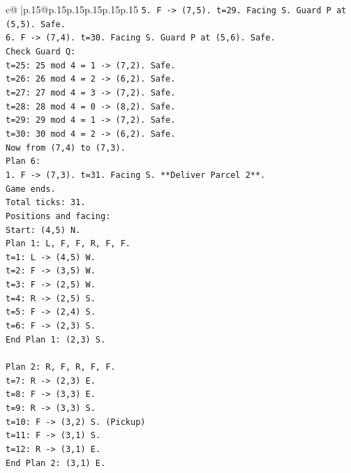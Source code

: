 \documentclass{article}
\begin{document}
{\begin{supertabular}{c@{$\;$}|p{.15\linewidth}@{}p{.15\linewidth}p{.15\linewidth}p{.15\linewidth}p{.15\linewidth}p{.15\linewidth}}
{{{\texttt{5. F {-}> (7,5). t=29. Facing S. Guard P at (5,5). Safe.} \\
\texttt{6. F {-}> (7,4). t=30. Facing S. Guard P at (5,6). Safe.} \\
\texttt{Check Guard Q:} \\
\texttt{t=25: 25 mod 4 = 1 {-}> (7,2). Safe.} \\
\texttt{t=26: 26 mod 4 = 2 {-}> (6,2). Safe.} \\
\texttt{t=27: 27 mod 4 = 3 {-}> (7,2). Safe.} \\
\texttt{t=28: 28 mod 4 = 0 {-}> (8,2). Safe.} \\
\texttt{t=29: 29 mod 4 = 1 {-}> (7,2). Safe.} \\
\texttt{t=30: 30 mod 4 = 2 {-}> (6,2). Safe.} \\
\texttt{Now from (7,4) to (7,3).} \\
\texttt{Plan 6:} \\
\texttt{1. F {-}> (7,3). t=31. Facing S. **Deliver Parcel 2**.} \\
\texttt{Game ends.} \\
\texttt{Total ticks: 31.} \\
\texttt{Positions and facing:} \\
\texttt{Start: (4,5) N.} \\
\texttt{Plan 1: L, F, F, R, F, F.} \\
\texttt{t=1: L {-}> (4,5) W.} \\
\texttt{t=2: F {-}> (3,5) W.} \\
\texttt{t=3: F {-}> (2,5) W.} \\
\texttt{t=4: R {-}> (2,5) S.} \\
\texttt{t=5: F {-}> (2,4) S.} \\
\texttt{t=6: F {-}> (2,3) S.} \\
\texttt{End Plan 1: (2,3) S.} \\
\\ 
\texttt{Plan 2: R, F, R, F, F.} \\
\texttt{t=7: R {-}> (2,3) E.} \\
\texttt{t=8: F {-}> (3,3) E.} \\
\texttt{t=9: R {-}> (3,3) S.} \\
\texttt{t=10: F {-}> (3,2) S. (Pickup)} \\
\texttt{t=11: F {-}> (3,1) S.} \\
\texttt{t=12: R {-}> (3,1) E.} \\
\texttt{End Plan 2: (3,1) E.} \\
\\ 
}}}
\end{supertabular}}
\end{document}
